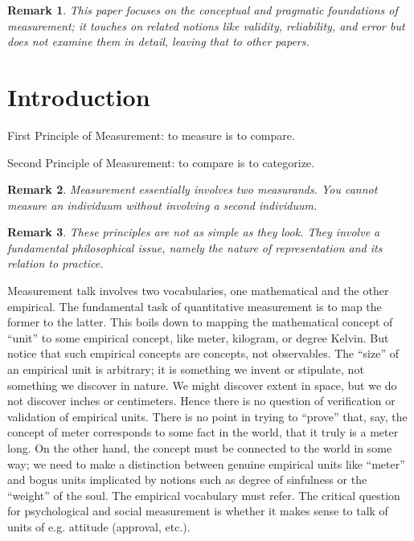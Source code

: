 \documentclass[11pt,twoside]{article}
\newtheorem{remark}{Remark}
\begin{document}
\begin{remark}
  This paper focuses on the conceptual and pragmatic foundations of
  measurement; it touches on related notions like validity,
  reliability, and error but does not examine them in detail, leaving
  that to other papers.
\end{remark}

\tableofcontents
\listoffigures

\clearpage
\section{Introduction}

First Principle of Measurement: to measure is to compare.

Second Principle of Measurement:  to compare is to categorize.

\begin{remark}
  Measurement essentially involves two measurands.  You cannot measure
  an individuum without involving a second individuum.
\end{remark}

\begin{remark}
  These principles are not as simple as they look.  They involve a
  fundamental philosophical issue, namely the nature of representation
  and its relation to practice.
\end{remark}

Measurement talk involves two vocabularies, one mathematical and the
other empirical.  The fundamental task of quantitative measurement is
to map the former to the latter.  This boils down to mapping the
mathematical concept of ``unit'' to some empirical concept, like
meter, kilogram, or degree Kelvin.  But notice that such empirical
concepts are concepts, not observables.  The ``size'' of an empirical
unit is arbitrary; it is something we invent or stipulate, not
something we discover in nature.  We might discover extent in space,
but we do not discover inches or centimeters.  Hence there is no
question of verification or validation of empirical units.  There is
no point in trying to ``prove'' that, say, the concept of meter
corresponds to some fact in the world, that it truly is a meter long.
On the other hand, the concept must be connected to the world in some
way; we need to make a distinction between genuine empirical units
like ``meter'' and bogus units implicated by notions such as degree of
sinfulness or the ``weight'' of the soul.  The empirical vocabulary
must refer.  The critical question for psychological and social
measurement is whether it makes sense to talk of units of
e.g. attitude (approval, etc.).
\end{document}
